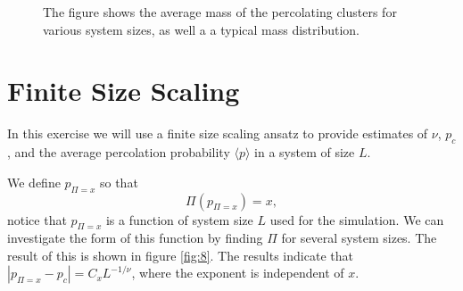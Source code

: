 \documentclass[12pt]{article}
\begin{document}
\begin{figure}[ht]

\caption[Optional caption for list of figures]{The figure shows the average mass of the percolating clusters for various system sizes, as well a a typical mass distribution.}
\label{fig:7}
\end{figure}

\clearpage
\section{Finite Size Scaling}
In this exercise we will use a finite size scaling ansatz to provide estimates of $\nu$, $p_c$, and the average percolation probability $\langle p \rangle$ in a system of size $L$.

We define $p_{\Pi=x}$ so that
\begin{equation}
 \Pi(p_{\Pi=x}) = x,
\end{equation}
notice that $p_{\Pi=x}$ is a function of system size $L$ used for the simulation. We can investigate the form of this function by finding $\Pi$ for several system sizes. The result of this is shown in figure \ref{fig:8}. The results indicate that $|p_{\Pi=x} - p_c| = C_xL^{-1/\nu}$, where the exponent is independent of $x$. 
\end{document}
